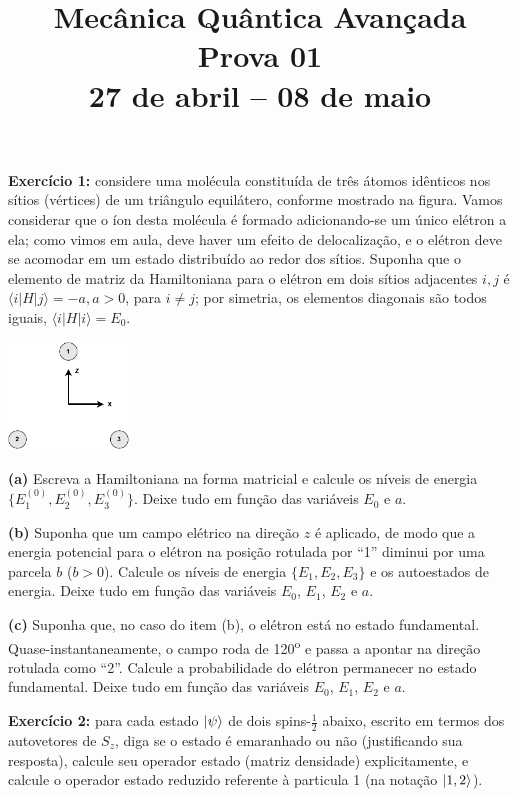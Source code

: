 \documentclass[12pt]{article}
\title{Mecânica Quântica Avançada\\%
Prova 01\\%
27 de abril -- 08 de maio}
\date{}
\begin{document}
\maketitle
\vspace*{-4em}

\textbf{Exercício 1:} considere uma molécula constituída de três átomos idênticos nos sítios (vértices) de um triângulo equilátero, conforme mostrado na figura.
Vamos considerar que o íon desta molécula é formado adicionando-se um único elétron a ela;
como vimos em aula, deve haver um efeito de delocalização, e o elétron deve se acomodar em um estado distribuído ao redor dos sítios.
Suponha que o elemento de matriz da Hamiltoniana para o elétron em dois sítios adjacentes $i,j$ é $\langle i|H|j \rangle = -a, a>0$, para $i \neq j$; por simetria, os elementos diagonais são todos iguais, $\langle i|H|i\rangle = E_0$.

\begin{center}
\includegraphics[width=0.24\textwidth]{Figures/EquilateralTriangleMolecule.drawio.pdf}
\end{center}

\textbf{(a)} Escreva a Hamiltoniana na forma matricial e calcule os níveis de energia
$\{E_1^{(0)}, E_2^{(0)}, E_3^{(0)}\}$. 
Deixe tudo em função das variáveis $E_0$ e $a$.

\textbf{(b)} Suponha que um campo elétrico na direção $z$ é aplicado, 
de modo que a energia potencial para o elétron na posição rotulada por ``1'' diminui por uma parcela $b$ ($b > 0$).
Calcule os níveis de energia
$\{E_1, E_2, E_3\}$
e os autoestados de energia.
Deixe tudo em função das variáveis $E_0$, $E_1$, $E_2$ e $a$.

\textbf{(c)} Suponha que, no caso do item (b), o elétron está no estado fundamental.
Quase-instantaneamente, o campo roda de 120\textsuperscript{o} e passa a apontar na direção rotulada como ``2''.
Calcule a probabilidade do elétron permanecer no estado fundamental.
Deixe tudo em função das variáveis $E_0$, $E_1$, $E_2$ e $a$.

\textbf{Exercício 2:} para cada estado $\ket{\psi}$ de dois spins-$\frac{1}{2}$ abaixo, 
escrito em termos dos autovetores de $S_z$, diga se o estado é emaranhado ou não (justificando sua resposta), 
calcule seu operador estado (matriz densidade) explicitamente,
e calcule o operador estado reduzido referente à particula 1 (na notação $\ket{1,2}$).
\end{document}
